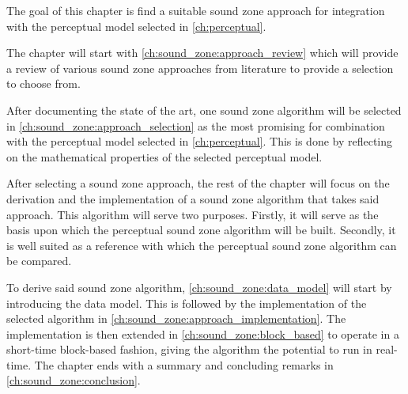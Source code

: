 The goal of this chapter is find a suitable sound zone approach for integration with the perceptual model selected in \autoref{ch:perceptual}.

The chapter will start with \autoref{ch:sound_zone:approach_review} which will provide a review of various sound zone approaches from literature to provide a selection to choose 
from.

After documenting the state of the art, one sound zone algorithm will be selected in \autoref{ch:sound_zone:approach_selection} as the most promising 
for combination with the perceptual model selected in \autoref{ch:perceptual}.
This is done by reflecting on the mathematical properties of the selected perceptual model.

After selecting a sound zone approach, the rest of the chapter will focus on the derivation and the implementation of a sound zone algorithm that takes 
said approach.
This algorithm will serve two purposes.
Firstly, it will serve as the basis upon which the perceptual sound zone algorithm will be built.
Secondly, it is well suited as a reference with which the perceptual sound zone algorithm can be compared.

To derive said sound zone algorithm, \autoref{ch:sound_zone:data_model} will start by introducing the data model.
This is followed by the implementation of the selected algorithm in \autoref{ch:sound_zone:approach_implementation}.
The implementation is then extended in \autoref{ch:sound_zone:block_based} to operate in a short-time block-based fashion, 
giving the algorithm the potential to run in real-time.
The chapter ends with a summary and concluding remarks in \autoref{ch:sound_zone:conclusion}.
